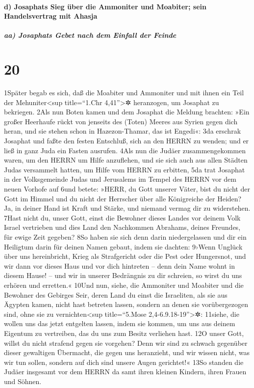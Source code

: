 \hypertarget{d-josaphats-sieg-uxfcber-die-ammoniter-und-moabiter-sein-handelsvertrag-mit-ahasja}{%
\paragraph{d) Josaphats Sieg über die Ammoniter und Moabiter; sein
Handelsvertrag mit
Ahasja}\label{d-josaphats-sieg-uxfcber-die-ammoniter-und-moabiter-sein-handelsvertrag-mit-ahasja}}

\hypertarget{aa-josaphats-gebet-nach-dem-einfall-der-feinde}{%
\subparagraph{aa) Josaphats Gebet nach dem Einfall der
Feinde}\label{aa-josaphats-gebet-nach-dem-einfall-der-feinde}}

\hypertarget{section-19}{%
\section{20}\label{section-19}}

1Später begab es sich, daß die Moabiter und Ammoniter und mit ihnen ein
Teil der Mehuniter\textless sup title=``1.Chr 4,41''\textgreater✲
heranzogen, um Josaphat zu bekriegen. 2Als nun Boten kamen und dem
Josaphat die Meldung brachten: »Ein großer Heerhaufe rückt von jenseits
des (Toten) Meeres aus Syrien gegen dich heran, und sie stehen schon in
Hazezon-Thamar, das ist Engedi«: 3da erschrak Josaphat und faßte den
festen Entschluß, sich an den HERRN zu wenden; und er ließ in ganz Juda
ein Fasten ausrufen. 4Als nun die Judäer zusammengekommen waren, um den
HERRN um Hilfe anzuflehen, und sie sich auch aus allen Städten Judas
versammelt hatten, um Hilfe vom HERRN zu erbitten, 5da trat Josaphat in
der Volksgemeinde Judas und Jerusalems im Tempel des HERRN vor dem neuen
Vorhofe auf 6und betete: »HERR, du Gott unserer Väter, bist du nicht der
Gott im Himmel und du nicht der Herrscher über alle Königreiche der
Heiden? Ja, in deiner Hand ist Kraft und Stärke, und niemand vermag dir
zu widerstehen. 7Hast nicht du, unser Gott, einst die Bewohner dieses
Landes vor deinem Volk Israel vertrieben und dies Land den Nachkommen
Abrahams, deines Freundes, für ewige Zeit gegeben? 8So haben sie sich
denn darin niedergelassen und dir ein Heiligtum darin für deinen Namen
gebaut, indem sie dachten: 9›Wenn Unglück über uns hereinbricht, Krieg
als Strafgericht oder die Pest oder Hungersnot, und wir dann vor dieses
Haus und vor dich hintreten -- denn dein Name wohnt in diesem Hause! --
und wir in unserer Bedrängnis zu dir schreien, so wirst du uns erhören
und erretten.« 10Und nun, siehe, die Ammoniter und Moabiter und die
Bewohner des Gebirges Seir, deren Land du einst die Israeliten, als sie
aus Ägypten kamen, nicht hast betreten lassen, sondern an denen sie
vorübergezogen sind, ohne sie zu vernichten\textless sup title=``5.Mose
2,4-6.9.18-19''\textgreater✲: 11siehe, die wollen uns das jetzt
entgelten lassen, indem sie kommen, um uns aus deinem Eigentum zu
vertreiben, das du uns zum Besitz verliehen hast. 12O unser Gott, willst
du nicht strafend gegen sie vorgehen? Denn wir sind zu schwach gegenüber
dieser gewaltigen Übermacht, die gegen uns heranzieht, und wir wissen
nicht, was wir tun sollen, sondern auf dich sind unsere Augen
gerichtet!« 13So standen die Judäer insgesamt vor dem HERRN da samt
ihren kleinen Kindern, ihren Frauen und Söhnen.

